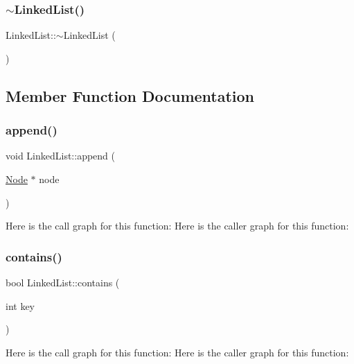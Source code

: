 \subsubsection{\texorpdfstring{$\sim$\+Linked\+List()}{~LinkedList()}}
{\footnotesize\ttfamily Linked\+List\+::$\sim$\+Linked\+List (\begin{DoxyParamCaption}{ }\end{DoxyParamCaption})}



\subsection{Member Function Documentation}
\mbox{\label{class_linked_list_a2e67fa8d36b83febafbd5f3801ec43db}} 
\subsubsection{\texorpdfstring{append()}{append()}}
{\footnotesize\ttfamily void Linked\+List\+::append (\begin{DoxyParamCaption}\item[{\hyperlink{class_node}{Node} $\ast$}]{node }\end{DoxyParamCaption})}

Here is the call graph for this function\+:
Here is the caller graph for this function\+:
\mbox{\label{class_linked_list_ac2fac6f86f1891576b57c2866ff77803}} 
\subsubsection{\texorpdfstring{contains()}{contains()}}
{\footnotesize\ttfamily bool Linked\+List\+::contains (\begin{DoxyParamCaption}\item[{int}]{key }\end{DoxyParamCaption})}

Here is the call graph for this function\+:
Here is the caller graph for this function\+:
\mbox{\label{class_linked_list_a67c86ff482738c1ab36bb8c764a7f3f7}} 

